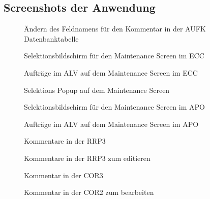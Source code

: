 \subsection{Screenshots der Anwendung}
\label{Screenshots}
\begin{figure}[htb]
\centering
{}
\caption{Ändern des Feldnamens für den Kommentar in der AUFK Datenbanktabelle}
\end{figure}
\clearpage
\begin{figure}[htb]
\centering
{}
\caption{Selektionsbildschirm für den Maintenance Screen im ECC}
\end{figure}
\clearpage
\begin{figure}[htb]
\centering
{}
\caption{Aufträge im ALV auf dem Maintenance Screen im ECC}
\end{figure}
\clearpage
\begin{figure}[htb]
\centering
{}
\caption{Selektions Popup auf dem Maintenance Screen}
\end{figure}
\clearpage
\begin{figure}[htb]
\centering
{}
\caption{Selektionsbildschirm für den Maintenance Screen im APO}
\end{figure}
\clearpage
\begin{figure}[htb]
\centering
{}
\caption{Aufträge im ALV auf dem Maintenance Screen im APO}
\end{figure}
\clearpage
\begin{figure}[htb]
\centering
{}
\caption{Kommentare in der RRP3}
\end{figure}
\clearpage
\begin{figure}[htb]
\centering
{}
\caption{Kommentare in der RRP3 zum editieren}
\end{figure}
\clearpage
\begin{figure}[htb]
\centering
{}
\caption{Kommentar in der COR3}
\end{figure}
\clearpage
\begin{figure}[htb]
\centering
{}
\caption{Kommentar in der COR2 zum bearbeiten}
\end{figure}
\clearpage